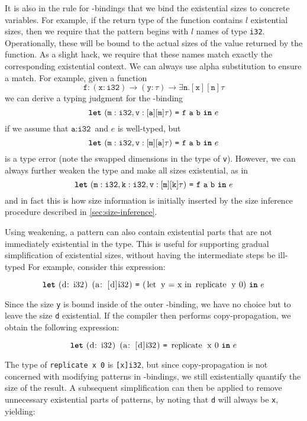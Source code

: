 It is also in the rule for -bindings that we bind the
existential sizes to concrete variables.  For example, if the return
type of the function contains $l$ existential sizes, then we require
that the pattern begins with $l$ names of type \texttt{i32}.
Operationally, these will be bound to the actual sizes of the value
returned by the function.  As a slight hack, we require that these
names match exactly the corresponding existential context.  We can
always use alpha substitution to ensure a match.  For example, given a
function
\[
  \texttt{f}: (\texttt{x}: \texttt{i32}) \rightarrow (\texttt{y}: \tau) \rightarrow \exists \texttt{n}.[\texttt{x}][\texttt{n}]\tau
\]
we can derive a typing judgment for the -binding
\[
\mbox{\texttt{\bfseries{let}}}~(\texttt{m}: \texttt{i32}, \texttt{v}: [\texttt{a}][\texttt{m}]\tau)~\mbox{\texttt{=}}~\texttt{f}~\texttt{a}~\texttt{b}~\mbox{\texttt{\bfseries{in}}}~e
\]
if we assume that $\texttt{a}: \texttt{i32}$ and $e$ is well-typed,
but
\[
\mbox{\texttt{\bfseries{let}}}~(\texttt{m}: \texttt{i32}, \texttt{v}: [\texttt{m}][\texttt{a}]\tau)~\mbox{\texttt{=}}~\texttt{f}~\texttt{a}~\texttt{b}~\mbox{\texttt{\bfseries{in}}}~e
\]
is a type error (note the swapped dimensions in the type of
\texttt{v}).  However, we can always further weaken the type and make
all sizes existential, as in
\[
\mbox{\texttt{\bfseries{let}}}~(\texttt{m}: \texttt{i32}, \texttt{k}: \texttt{i32}, \texttt{v}: [\texttt{m}][\texttt{k}]\tau)~\mbox{\texttt{=}}~\texttt{f}~\texttt{a}~\texttt{b}~\mbox{\texttt{\bfseries{in}}}~e
\]
and in fact this is how size information is initially inserted by the
size inference procedure described in \cref{sec:size-inference}.

Using weakening, a pattern can also contain existential parts that are
not immediately existential in the type.  This is useful for
supporting gradual simplification of existential sizes, without having
the intermediate steps be ill-typed For example, consider this
expression:

\[
\Let{\mbox{\lstinline{(d: i32) (a: [d]i32)}}}{\mbox{\lstinline{(let y = x in replicate y 0)}}}{e}
\]

Since the size \texttt{y} is bound inside of the outer
-binding, we have no choice but to leave the size \texttt{d}
existential.  If the compiler then performs copy-propagation, we
obtain the following expression:

\[
\Let{\mbox{\lstinline{(d: i32) (a: [d]i32)}}}{\mbox{\lstinline{replicate x 0}}}{e}
\]

The type of \lstinline{replicate x 0} is \lstinline{[x]i32}, but since
copy-propagation is not concerned with modifying patterns in
-bindings, we still existentially quantify the size of the
result.  A subsequent simplification can then be applied to remove
unnecessary existential parts of patterns, by noting that \texttt{d}
will always be \texttt{x}, yielding:

